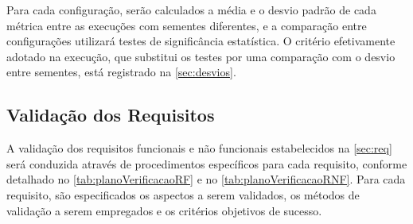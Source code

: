 Para cada configuração, serão calculados a média e o desvio padrão de cada métrica entre as execuções com sementes diferentes, e a comparação entre configurações utilizará testes de significância estatística. O critério efetivamente adotado na execução, que substitui os testes por uma comparação com o desvio entre sementes, está registrado na \autoref{sec:desvios}.

\subsection{Validação dos Requisitos}

A validação dos requisitos funcionais e não funcionais estabelecidos na \autoref{sec:req} será conduzida através de procedimentos específicos para cada requisito, conforme detalhado no \autoref{tab:planoVerificacaoRF} e no \autoref{tab:planoVerificacaoRNF}. Para cada requisito, são especificados os aspectos a serem validados, os métodos de validação a serem empregados e os critérios objetivos de sucesso.

